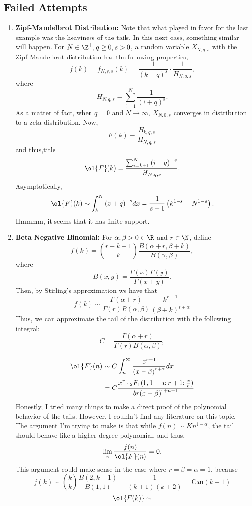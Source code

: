 \subsection*{Failed Attempts}

\begin{enumerate}
    \item \textbf{Zipf-Mandelbrot Distribution:} Note that what played in favor for the last example was the heaviness of the tails. In this next case, something similar will happen. For $N \in \Z^+, q \geq 0, s > 0$, a random variable $X_{N,q,s}$ with the Zipf-Mandelbrot distribution has the following properties,
    \[ f(k) = f_{N,q,s}(k) = \frac{1}{{(k+q)}^s}\cdot \frac{1}{H_{N,q,s}}, \]
    where
    \[ H_{N,q,s} = \sum_{i = 1}^N \frac{1}{{(i+q)}^s}. \]
    As a matter of fact, when $q = 0$ and $N\to\infty$, $X_{N,0,s}$ converges in distribution to a zeta distribution. Now,
    \[ F(k) = \frac{H_{k,q,s}}{H_{N,q,s}} \]
    and thus,title
    \[ \ol{F}(k) = \frac{\sum_{i = k+1}^N{(i+q)}^{-s}}{H_{N,q,s}}.\]
    Asymptotically,
    \[ \ol{F}(k) \sim \int_{k}^N {(x+q)}^{-s} dx = \frac{1}{s-1}\left( k^{1-s} - N^{1-s} \right). \]
    Hmmmm, it seems that it has finite support.
    \item \textbf{Beta Negative Binomial:} For $\alpha, \beta > 0 \in \R$ and $r\in\N$, define
    \[ f(k) = \binom{r+k-1}{k} \frac{B(\alpha + r, \beta+k)}{B(\alpha,\beta)}, \]
    where
    \[ B(x,y) = \frac{\Gamma(x)\Gamma(y)}{\Gamma(x+y)}. \]
    Then, by Stirling's approximation we have that
    \[ f(k) \sim \frac{\Gamma(\alpha + r )}{\Gamma(r)B(\alpha,\beta)} \frac{k^{r-1}}{{(\beta+k)}^{r+\alpha}}\]
    Thus, we can approximate the tail of the distribution with the following integral:
    \[ C = \frac{\Gamma(\alpha + r )}{\Gamma(r)B(\alpha,\beta)}, \]
    \[ \everymath{\displaystyle}
    \arraycolsep=1.8pt\def\arraystretch{2.5}
    \begin{array}{rl}
        \ol{F}(n) & \sim C\int_{n}^{\infty} \frac{x^{r-1}}{{(x-\beta)}^{r+\alpha}} dx\\
        & = C \frac{x^r \cdot {}_2F_1(1,1-a;r+1; \tfrac{x}{b}) }{br{(x-\beta)}^{r+a-1}}
    \end{array} \]
    Honestly, I tried many things to make a direct proof of the polynomial behavior of the tails. However, I couldn't find any literature on this topic. The argument I'm trying to make is that while $f(n) \sim K n^{1-\alpha}$, the tail should behave like a higher degree polynomial, and thus,
    \[ \lim_n \frac{f(n)}{\ol{F}(n)} = 0.\]
    This argument could make sense in the case where $r = \beta = \alpha = 1$, because 
    \[ f(k) \sim \binom{k}{k} \frac{B(2,k+1)}{B(1,1)} = \frac{1}{(k+1)(k+2)} = \text{Cau}(k+1)\]
    \[ \ol{F(k)} \sim \]
\end{enumerate}
